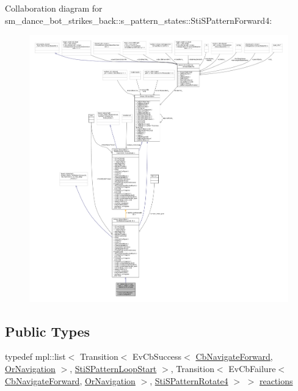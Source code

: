 Collaboration diagram for sm\+\_\+dance\+\_\+bot\+\_\+strikes\+\_\+back\+:\+:s\+\_\+pattern\+\_\+states\+:\+:Sti\+S\+Pattern\+Forward4\+:
\nopagebreak
\begin{figure}[H]
\begin{center}
\leavevmode
\includegraphics[width=350pt]{structsm__dance__bot__strikes__back_1_1s__pattern__states_1_1StiSPatternForward4__coll__graph}
\end{center}
\end{figure}
\subsection*{Public Types}
\begin{DoxyCompactItemize}
\item 
typedef mpl\+::list$<$ Transition$<$ Ev\+Cb\+Success$<$ \hyperlink{classcl__move__base__z_1_1CbNavigateForward}{Cb\+Navigate\+Forward}, \hyperlink{classsm__dance__bot__strikes__back_1_1OrNavigation}{Or\+Navigation} $>$, \hyperlink{structsm__dance__bot__strikes__back_1_1s__pattern__states_1_1StiSPatternLoopStart}{Sti\+S\+Pattern\+Loop\+Start} $>$, Transition$<$ Ev\+Cb\+Failure$<$ \hyperlink{classcl__move__base__z_1_1CbNavigateForward}{Cb\+Navigate\+Forward}, \hyperlink{classsm__dance__bot__strikes__back_1_1OrNavigation}{Or\+Navigation} $>$, \hyperlink{structsm__dance__bot__strikes__back_1_1s__pattern__states_1_1StiSPatternRotate4}{Sti\+S\+Pattern\+Rotate4} $>$ $>$ \hyperlink{structsm__dance__bot__strikes__back_1_1s__pattern__states_1_1StiSPatternForward4_a9edf6136faafbfe6bb7097807cef4205}{reactions}
\end{DoxyCompactItemize}
